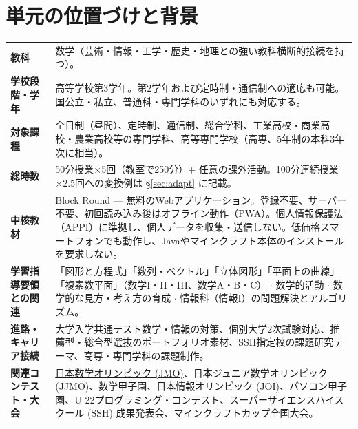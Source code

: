 \documentclass[12pt,a4paper]{scrartcl}
\begin{document}
\renewcommand{\contentsname}{\color{accent}目次}
\tableofcontents
\thispagestyle{fancy}
\newpage

\section{単元の位置づけと背景}\label{sec:identificacao}

\begin{center}
\begin{tabular}{@{}p{}p{}@{}}
\toprule
\textbf{教科} & 数学（芸術・情報・工学・歴史・地理との強い教科横断的接続を持つ）。 \\
\addlinespace[2pt]
\textbf{学校段階・学年} & 高等学校第3学年。第2学年および定時制・通信制への適応も可能。国公立・私立、普通科・専門学科のいずれにも対応する。 \\
\addlinespace[2pt]
\textbf{対象課程} & 全日制（昼間）、定時制、通信制、総合学科、工業高校・商業高校・農業高校等の専門学科、高等専門学校（高専、5年制の本科3年次に相当）。 \\
\addlinespace[2pt]
\textbf{総時数} & 50分授業×5回（教室で250分）+ 任意の課外活動。100分連続授業×2.5回への変換例は §\ref{sec:adapt} に記載。 \\
\addlinespace[2pt]
\textbf{中核教材} & Block Round --- 無料のWebアプリケーション。登録不要、サーバー不要、初回読み込み後はオフライン動作（PWA）。個人情報保護法（APPI）に準拠し、個人データを収集・送信しない。低価格スマートフォンでも動作し、Javaやマインクラフト本体のインストールを要求しない。 \\
\addlinespace[2pt]
\textbf{学習指導要領との関連} & 「図形と方程式」「数列・ベクトル」「立体図形」「平面上の曲線」「複素数平面」（数学I・II・III、数学A・B・C） $\cdot$ 数学的活動 $\cdot$ 数学的な見方・考え方の育成 $\cdot$ 情報科（情報I）の問題解決とアルゴリズム。 \\
\addlinespace[2pt]
\textbf{進路・キャリア接続} & 大学入学共通テスト数学・情報の対策、個別大学2次試験対応、推薦型・総合型選抜のポートフォリオ素材、SSH指定校の課題研究テーマ、高専・専門学科の課題制作。 \\
\addlinespace[2pt]
\textbf{関連コンテスト・大会} & \hyperref[sec:jmo]{日本数学オリンピック (JMO)}、日本ジュニア数学オリンピック (JJMO)、数学甲子園、日本情報オリンピック (JOI)、パソコン甲子園、U-22プログラミング・コンテスト、スーパーサイエンスハイスクール (SSH) 成果発表会、マインクラフトカップ全国大会。 \\

\end{tabular}
\end{center}
\end{document}

